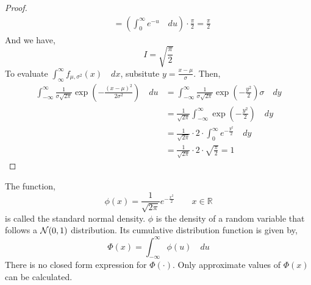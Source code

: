 \begin{proof}
\begin{align*}
        &= \left(
               \int_{0}^{\infty} e^{-u} \quad du
           \right)
           \cdot \frac{\pi}{2}
         = \frac{\pi}{2}
\end{align*}
And we have,
\[
    I = \sqrt{\frac{\pi}{2}}
\]
To evaluate $\int_{\infty}^{\infty} f_{\mu, \sigma^2}(x) \quad dx$, subsitute
$y = \frac{x - \mu}{\sigma}$. Then,
\begin{align*}
    \int_{-\infty}^{\infty} 
         \frac{1}{\sigma \sqrt{2\pi}}
         \exp \left( - \frac{(x - \mu)^2}{2 \sigma^2} \right)
    \quad du
    &= \int_{-\infty}^{\infty}
           \frac{1}{\sigma \sqrt{2\pi}}
           \exp \left( - \frac{y^2}{2} \right) \sigma
        \quad dy                                                             \\
    &= \frac{1}{\sqrt{2 \pi}}
       \int_{-\infty}^{\infty}
           \exp \left( - \frac{y^2}{2} \right) 
       \quad dy                                                              \\
    &= \frac{1}{\sqrt{2 \pi}} \cdot 2 \cdot
       \int_{0}^{\infty} e^{-\frac{y^2}{2}} \quad dy                         \\
    &= \frac{1}{\sqrt{2 \pi}} \cdot 2 \cdot \sqrt{\frac{\pi}{2}}        
     = 1
\end{align*}
\end{proof}

\begin{definition}
The function,
\[
    \phi(x) = \frac{1}{\sqrt{2 \pi}} e^{-\frac{x^2}{2}} \qquad x \in \mathbb{R}
\]
is called the standard normal density. $\phi$ is the density of a random
variable that follows a $\mathcal{N}(0, 1)$ distribution. Its cumulative
distribution function is given by,
\[
    \Phi(x) = \int_{-\infty}^{\infty} \phi(u) \quad du
\]
There is no closed form expression for $\Phi(\cdot)$. Only approximate values
of $\Phi(x)$ can be calculated.
\begin{figure}[H]
    \centering
    \def\svgwidth{0.5\linewidth}
        
\end{figure}
\end{definition}

